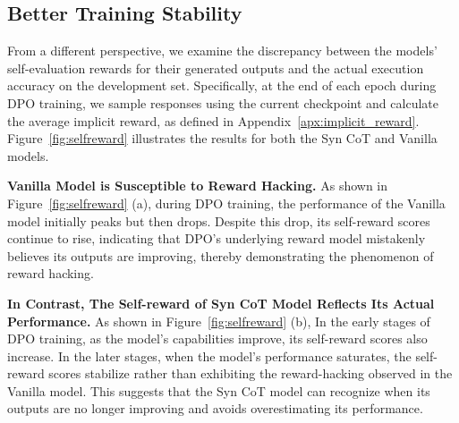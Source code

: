 


\subsection{Better Training Stability}
From a different perspective, we examine the discrepancy between the models' self-evaluation rewards for their generated outputs and the actual execution accuracy on the development set. Specifically, at the end of each epoch during DPO training, we sample responses using the current checkpoint and calculate the average implicit reward, as defined in Appendix~\ref{apx:implicit_reward}. Figure~\ref{fig:selfreward} illustrates the results for both the Syn CoT and Vanilla models.

\textbf{Vanilla Model is Susceptible to Reward Hacking.} As shown in Figure~\ref{fig:selfreward} (a), during DPO training, the performance of the Vanilla model initially peaks but then drops. Despite this drop, its self-reward scores continue to rise, indicating that DPO's underlying reward model mistakenly believes its outputs are improving, thereby demonstrating the phenomenon of reward hacking.


\textbf{In Contrast, The Self-reward of Syn CoT Model Reflects Its Actual Performance.} As shown in Figure~\ref{fig:selfreward} (b), In the early stages of DPO training, as the model's capabilities improve, its self-reward scores also increase. In the later stages, when the model's performance saturates, the self-reward scores stabilize rather than exhibiting the reward-hacking observed in the Vanilla model. This suggests that the Syn CoT model can recognize when its outputs are no longer improving and avoids overestimating its performance.

